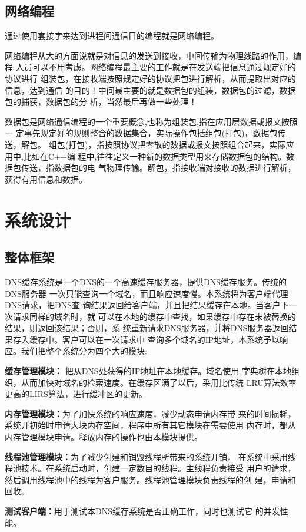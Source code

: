 \documentclass[12pt, a4paper, titlepage]{article}
\begin{document}
\subsection{网络编程}
\par{通过使用套接字来达到进程间通信目的编程就是网络编程。}
\par{网络编程从大的方面说就是对信息的发送到接收，中间传输为物理线路的作用，编程
	人员可以不用考虑。网络编程最主要的工作就是在发送端把信息通过规定好的协议进行
	组装包，在接收端按照规定好的协议把包进行解析，从而提取出对应的信息，达到通信
	的目的！中间最主要的就是数据包的组装，数据包的过滤，数据包的捕获，数据包的分
	析，当然最后再做一些处理！
}
\par{数据包是网络通信编程的一个重要概念,也称为组装包,指在应用层数据或报文按照一
	定事先规定好的规则整合的数据集合，实际操作包括组包(打包)，数据包传送，解包。
	组包(打包)，指按照协议把零散的数据或报文按照组合起来，实际应用中,比如在C++编
	程中,往往定义一种新的数据类型用来存储数据包的结构。数据包传送，指数据包的电
	气物理传输。解包，指接收端对接收的数据进行解析，获得有用信息和数据。
}

\section{系统设计}
\subsection{整体框架}
\par{DNS缓存系统是一个DNS的一个高速缓存服务器，提供DNS缓存服务。传统的DNS服务器
	一次只能查询一个域名，而且响应速度慢。本系统将为客户端代理DNS请求，把DNS查
	询结果返回给客户端，并且把结果缓存在本地。当客户下一次请求同样的域名时，就
	可以在本地的缓存中查找，如果缓存中存在未被替换的结果，则返回该结果；否则，系
	统重新请求DNS服务器，并将DNS服务器返回结果存入缓存中。客户可以在一次请求中
	查询多个域名的IP地址，本系统予以响应。我们把整个系统分为四个大的模块:	
}
\begin{compactitem}
     \item{\textbf{缓存管理模块：} 把从DNS处获得的IP地址在本地缓存。域名使用
     字典树\cite{IDAT}在本地组织，从而加快对域名的检索速度。在缓存区满了以后，采用比传统
     LRU算法效率更高的LIRS\cite{LIRS}算法，进行缓冲区的更新。}
    \item{\textbf{内存管理模块：}为了加快系统的响应速度，减少动态申请内存带
     来的时间损耗，系统开初始时申请大块内存空间，程序中所有其它模块在需要使用
     内存时，都从内存管理模块申请。释放内存的操作也由本模块提供。}
     \item{\textbf{线程池管理模块：}为了减少创建和销毁线程所带来的系统开销，
     在系统中采用线程池技术。在系统启动时，创建一定数目的线程。主线程负责接受
     用户的请求，然后调用线程池中的线程为客户服务。线程池管理模块负责线程的创
     建，申请和回收。}
     \item{\textbf{测试客户端：}用于测试本DNS缓存系统是否正确工作，同时也测试它
     的并发性能。}
\end{compactitem}
\end{document}
